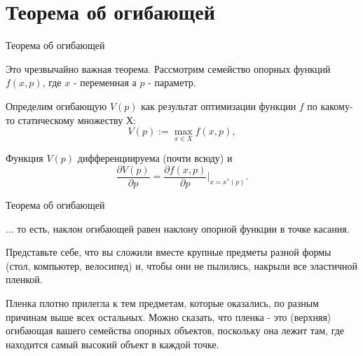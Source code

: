 \documentclass{beamer}
\begin{document}
%
%
%
%
%

\section{Теорема об огибающей}

\begin{frame}{Теорема об огибающей}

Это чрезвычайно важная теорема. Рассмотрим семейство опорных функций $f(x, p)$, где $x$ - переменная а $p$ - параметр. 

Определим огибающую $V(p)$ как результат оптимизации функции $f$ по какому-то статическому множеству $Х$: 
$$ V(p) := \max_{x \in X} f(x, p),$$

\begin{theorem}[Об огибающей]
Функция $V(p)$ дифференциируема (почти всюду) и 
$$\frac{\partial V(p)}{\partial p} = \frac{\partial f(x, p)}{\partial p}|_{x = x^{\ast}(p)}.$$
\end{theorem}

\end{frame}

\begin{frame}{Теорема об огибающей}

... то есть, наклон огибающей равен наклону опорной функции в точке касания.

Представьте себе, что вы сложили вместе крупные предметы разной формы (стол, компьютер, велосипед) и, чтобы они не пылились, накрыли все эластичной пленкой. 

Пленка плотно прилегла к тем предметам, которые оказались, по разным причинам выше всех остальных. Можно сказать, что пленка - это (верхняя) огибающая вашего семейства опорных объектов, поскольку она лежит там, где находится самый высокий объект в каждой точке.

\end{frame}
\end{document}
